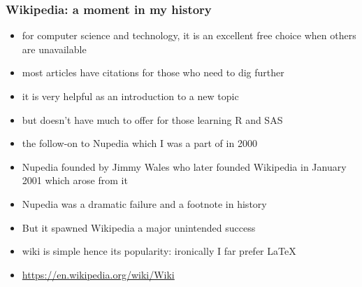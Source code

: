 \documentclass[11pt,pdftex,dvipsnames,usenames,helvetica]{beamer}
\begin{document}
\begin{frame}
\frametitle{Wikipedia: a moment in my history}

\begin{itemize}
\item for computer science and technology, it is an excellent free
  choice when others are unavailable
\item most articles have citations for those who need to dig further
\item it is very helpful as an introduction to a new topic
\item but doesn't have much to offer for those learning R and SAS
\item the follow-on to Nupedia which I was a part of in 2000
\item Nupedia founded by Jimmy Wales %
who later founded Wikipedia in January 2001 which arose from it
\item Nupedia was a dramatic failure and a footnote in history
\item But it spawned Wikipedia a major unintended success
\item wiki is simple hence its popularity: ironically I far prefer LaTeX
\item \url{https://en.wikipedia.org/wiki/Wiki}
\end{itemize}
\end{frame}
\end{document}
